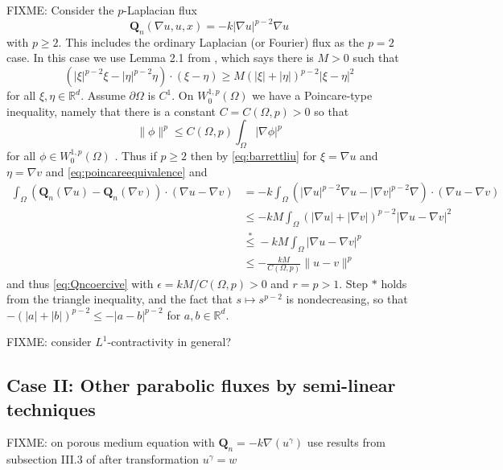 \documentclass[final,leqno,onefignum,onetabnum]{siamltex1213bueler}
\newcommand\bQ{\mathbf{Q}}
\newcommand\eps{\epsilon}
\renewcommand{\grad}{\nabla}
\newcommand\RR{\mathbb{R}}
\begin{document}
FIXME: Consider the $p$-Laplacian flux
\begin{equation}
  \bQ_n(\grad u,u,x) = - k |\grad u|^{p-2} \grad u
\end{equation}
with $p\ge 2$.  This includes the ordinary Laplacian (or Fourier) flux as the $p=2$ case.  In this case we use Lemma 2.1 from \cite{BarrettLiu1993}, which says there is $M>0$ such that
\begin{equation}
    (|\xi|^{p-2}\xi - |\eta|^{p-2}\eta)\cdot (\xi - \eta) \ge M \left(|\xi|+|\eta|\right)^{p-2} |\xi-\eta|^2  \label{eq:barrettliu}
\end{equation}
for all $\xi,\eta\in\RR^d$.  Assume $\partial \Omega$ is $C^1$.  On $W_0^{1,p}(\Omega)$ we have a Poincare-type inequality, namely  that there is a constant $C = C(\Omega,p)>0$ so that
\begin{equation}
  \|\phi\|^p \le C(\Omega,p) \int_\Omega |\grad \phi|^p  \label{eq:poincareequivalence}
\end{equation}
for all $\phi\in W_0^{1,p}(\Omega)$ \cite[theorem 5.6.3]{Evans}.  Thus if $p\ge 2$ then by \eqref{eq:barrettliu} for $\xi = \grad u$ and $\eta = \grad v$ and \eqref{eq:poincareequivalence} and
\begin{align*}
\int_\Omega \left(\bQ_n(\grad u) - \bQ_n(\grad v)\right)\cdot (\grad u - \grad v) &= -k  \int_\Omega \left(|\grad u|^{p-2} \grad u - |\grad v|^{p-2} \grad \right)\cdot (\grad u - \grad v) \\
  &\le - k M  \int_\Omega \left(|\grad u| + |\grad v|\right)^{p-2} |\grad u - \grad v|^2 \\
  &\stackrel{\ast}{\le} - k M  \int_\Omega |\grad u - \grad v|^p \\
  &\le - \frac{k M}{C(\Omega,p)} \|u-v\|^p
\end{align*}
and thus \eqref{eq:Qncoercive} with $\eps = kM/C(\Omega,p) > 0$ and $r=p>1$.  Step $\ast$ holds from the triangle inequality, and the fact that $s\mapsto s^{p-2}$ is nondecreasing, so that $-(|a| + |b|)^{p-2} \le - |a-b|^{p-2}$ for $a,b\in\RR^d$.


FIXME: consider $L^1$-contractivity in general?


\subsection{Case II: Other parabolic fluxes by semi-linear techniques} \label{subsec:semilinear}  FIXME:  on porous medium equation with $\bQ_n = - k \grad(u^\gamma)$ use results from subsection III.3 of \cite{KinderlehrerStampacchia} after transformation $u^\gamma=w$
\end{document}
